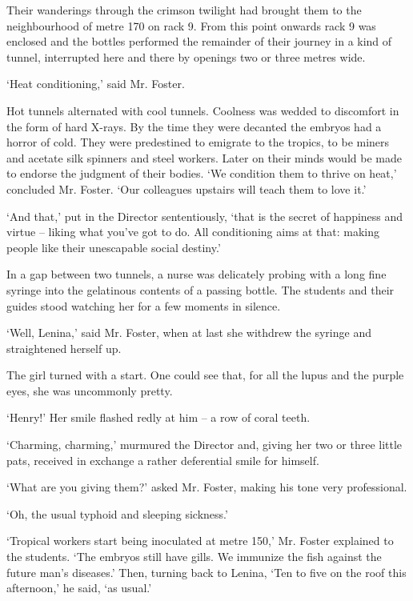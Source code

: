 \documentclass[10pt,a4paper]{article}
\newcommand{\sqm}[1]{‘#1’}
\begin{document}
Their wanderings through the crimson twilight had brought them to the neighbourhood of metre 170 on rack 9. From this point onwards rack 9 was enclosed and the bottles performed the remainder of their journey in a kind of tunnel, interrupted here and there by openings two or three metres wide.

\sqm{Heat conditioning,} said Mr. Foster.

Hot tunnels alternated with cool tunnels. Coolness was wedded to discomfort in the form of hard X-rays. By the time they were decanted the embryos had a horror of cold. They were predestined to emigrate to the tropics, to be miners and acetate silk spinners and steel workers. Later on their minds would be made to endorse the judgment of their bodies. \sqm{We condition them to thrive on heat,} concluded Mr. Foster. \sqm{Our colleagues upstairs will teach them to love it.}

\sqm{And that,} put in the Director sententiously, \sqm{that is the secret of happiness and virtue – liking what you've got to do. All conditioning aims at that: making people like their unescapable social destiny.}

In a gap between two tunnels, a nurse was delicately probing with a long fine syringe into the gelatinous contents of a passing bottle. The students and their guides stood watching her for a few moments in silence.

\sqm{Well, Lenina,} said Mr. Foster, when at last she withdrew the syringe and straightened herself up.

The girl turned with a start. One could see that, for all the lupus and the purple eyes, she was uncommonly pretty.

\sqm{Henry!} Her smile flashed redly at him – a row of coral teeth.

\sqm{Charming, charming,} murmured the Director and, giving her two or three little pats, received in exchange a rather deferential smile for himself.

\sqm{What are you giving them?} asked Mr. Foster, making his tone very professional.

\sqm{Oh, the usual typhoid and sleeping sickness.}

\sqm{Tropical workers start being inoculated at metre 150,} Mr. Foster explained to the students. \sqm{The embryos still have gills. We immunize the fish against the future man's diseases.} Then, turning back to Lenina, \sqm{Ten to five on the roof this afternoon,} he said, \sqm{as usual.}
\end{document}
